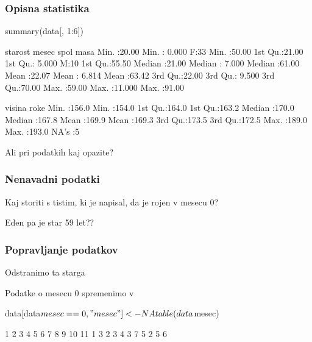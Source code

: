 \begin{frame}[fragile]
\frametitle{Opisna statistika}
\begin{Schunk}
\begin{Sinput}
  summary(data[, 1:6])
\end{Sinput}
\begin{Soutput}
    starost          mesec        spol        masa      
 Min.   :20.00   Min.   : 0.000   F:33   Min.   :50.00  
 1st Qu.:21.00   1st Qu.: 5.000   M:10   1st Qu.:55.50  
 Median :21.00   Median : 7.000          Median :61.00  
 Mean   :22.07   Mean   : 6.814          Mean   :63.42  
 3rd Qu.:22.00   3rd Qu.: 9.500          3rd Qu.:70.00  
 Max.   :59.00   Max.   :11.000          Max.   :91.00  
                                                        
     visina           roke      
 Min.   :156.0   Min.   :154.0  
 1st Qu.:164.0   1st Qu.:163.2  
 Median :170.0   Median :167.8  
 Mean   :169.9   Mean   :169.3  
 3rd Qu.:173.5   3rd Qu.:172.5  
 Max.   :189.0   Max.   :193.0  
                 NA's   :5      
\end{Soutput}
\end{Schunk}
Ali pri podatkih kaj opazite?
\end{frame}
\begin{frame}[fragile]
\frametitle{Nenavadni podatki}
Kaj storiti s tistim, ki je napisal, da je rojen v mesecu 0?

Eden pa je star 59 let??
\end{frame}

\begin{frame}[fragile]
\frametitle{Popravljanje podatkov}
Odstranimo ta starga
\begin{Schunk}
\end{Schunk}
Podatke o mesecu 0 spremenimo v 

\begin{Schunk}
\begin{Sinput}
  data[data$mesec == 0, "mesec"] <- NA
  table(data$mesec)
\end{Sinput}
\begin{Soutput}
 1  2  3  4  5  6  7  8  9 10 11 
 1  3  2  3  4  3  7  5  2  5  6 
\end{Soutput}
\end{Schunk}

\end{frame}



